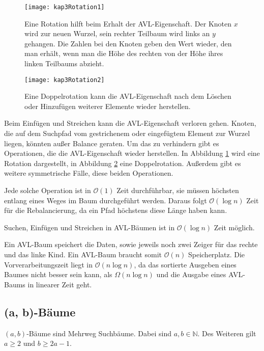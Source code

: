 \begin{figure}[htb]
  \centering
  \texttt{[image: kap3Rotation1]}
  \caption{Eine Rotation hilft beim Erhalt der AVL-Eigenschaft. Der Knoten $x$ wird zur neuen Wurzel, sein rechter Teilbaum wird links an $y$ gehangen. Die Zahlen bei den Knoten geben den Wert wieder, den man erhält, wenn man die Höhe des rechten von der Höhe ihres linken Teilbaums abzieht.}
  \label{kap3Rotation1}
\end{figure}

\begin{figure}[hbt]
  \centering
  \texttt{[image: kap3Rotation2]}
  \caption{Eine Doppelrotation kann die AVL-Eigenschaft nach dem Löschen oder Hinzufügen weiterer Elemente wieder herstellen.}
  \label{kap3Rotation2}
\end{figure}

Beim Einfügen und Streichen kann die AVL-Eigenschaft verloren gehen. Knoten, die auf dem Suchpfad vom gestrichenem oder eingefügtem Element zur Wurzel liegen, könnten außer Balance geraten. Um das zu verhindern gibt es Operationen, die die AVL-Eigenschaft wieder herstellen. In Abbildung \ref{kap3Rotation1} wird eine Rotation dargestellt, in Abbildung \ref{kap3Rotation2} eine Doppelrotation. Außerdem gibt es weitere symmetrische Fälle, diese beiden Operationen.

Jede solche Operation ist in $\mathcal{O}(1)$ Zeit durchführbar, sie müssen höchsten entlang eines Weges im Baum durchgeführt werden. Daraus folgt $\mathcal{O}(\log n)$ Zeit für die Rebalancierung, da ein Pfad höchstens diese Länge haben kann.

\begin{Satz}
\hspace{\parindent}Suchen, Einfügen und Streichen in AVL-Bäumen ist in $\mathcal{O}(\log n)$ Zeit möglich.
\end{Satz}

Ein AVL-Baum speichert die Daten, sowie jeweils noch zwei Zeiger für das rechte und das linke Kind. Ein AVL-Baum braucht somit $\mathcal{O}(n)$ Speicherplatz. Die Vorverarbeitungszeit liegt in $\mathcal{O}(n \log n)$, da das sortierte Ausgeben eines Baumes nicht besser sein kann, als $\Omega(n \log n)$ und die Ausgabe eines AVL-Baums in linearer Zeit geht.

\subsection{(a, b)-Bäume}
$(a, b)$-Bäume sind Mehrweg Suchbäume. Dabei sind $a, b \in \mathbb{N}$. Des Weiteren gilt $a \ge 2$ und $b \ge 2a -1$.

